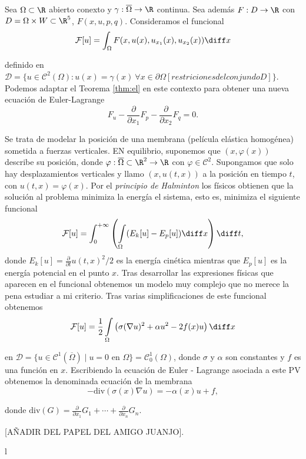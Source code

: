 \documentclass{article}
\begin{document}
  Sea $\Omega \subset \R$ abierto conexto y $\gamma : \overline{\Omega} \to \R$ continua. Sea además
  $F : D \to \R$ con $D = \Omega \times W \subset \R^5$, $F(x,u,p,q)$. Consideramos el funcional
  \[\mathcal{F}[u] = \int_{\Omega} F(x, u(x), u_{x_1}(x), u_{x_2}(x)) \diff x\]

  definido en
  $\mathcal{D} = \{u \in \mathcal{C}^{2}(\Omega): u(x) = \gamma(x) \ \forall x\in\partial\Omega
  [restriciones del conjundo D]\}$. Podemos adaptar el Teorema \ref{thm:el} en este contexto para
  obtener una nueva ecuación de Euler-Lagrange
  \begin{equation}
    \label{eq:el:general}
    F_u - \frac{\partial}{\partial x_1} F_p - \frac{\partial}{\partial x_2} F_q = 0.
  \end{equation}

\begin{ex} \label{ex:membrana}
  Se trata de modelar la posición de una membrana (película elástica homogénea) sometida a fuerzas
  verticales. EN equilibrio, suponemos que $(x,\varphi(x))$ describe su posición, donde
  $\varphi: \overline{\Omega} \subset \R^2 \to \R$ con $\varphi \in \mathcal{C}^2$. Supongamos que
  solo hay desplazamientos verticales y llamo $(x, u(t,x))$ a la posición en tiempo $t$, con
  $u(t,x) = \varphi(x)$. Por el \emph{principio de Halminton} los físicos obtienen que la solución
  al problema minimiza la energía el sistema, esto es, minimiza el siguiente funcional
  \[ \mathcal{F}[u] = \int_{0}^{+\infty}\left(\int\limits_{\Omega} (E_k[u] - E_p[u]) \diff x
    \right)\diff t, \] donde $E_k[u] = \frac{\partial}{\partial t} u(t,x)^2/ 2$ es la energía
  cinética mientras que $E_p[u]$ es la energía potencial en el punto $x$. Tras desarrollar las
  expresiones físicas que aparecen en el funcional obtenemos un modelo muy complejo que no merece la
  pena estudiar a mi criterio. Tras varias simplificaciones de este funcional obtenemos
  \[ \mathcal{F}[u] = \frac{1}{2} \int\limits_{\Omega} \left(\sigma (\nabla u)^2 + \alpha u^2 -
    2f(x) u \right) \diff x \]

  en $\mathcal{D} = \{u \in \mathcal{C}^1(\overline{\Omega}) \mid u = 0 \text{ en } \Omega\} =
  \mathcal{C}_0^1(\Omega)$, donde $\sigma$ y $\alpha$ son constantes y $f$ es una función en
  $x$. Escribiendo la ecuación de Euler - Lagrange asociada a este PV obtenemos la denominada ecuación
  de la membrana
  \[ -\mathrm{div}(\sigma(x)\nabla u) = - \alpha(x)u + f, \]

  donde $\mathrm{div}(G) = \frac{\partial}{\partial x_{1}} G_1 + \cdots + \frac{\partial}{\partial x_{n}} G_n$.

  [AÑADIR DEL PAPEL DEL AMIGO JUANJO].
\end{ex}
l
\end{document}
